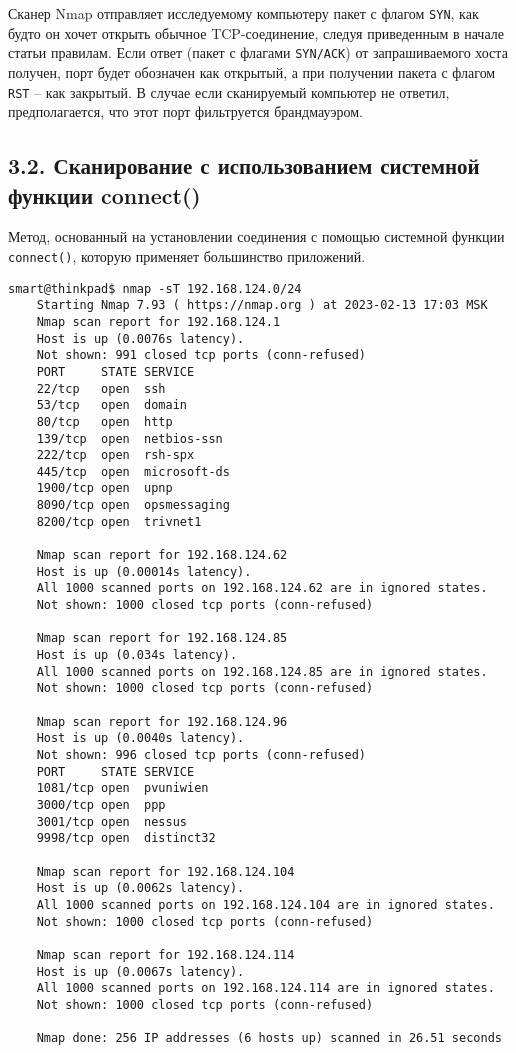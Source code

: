 Сканер Nmap отправляет исследуемому компьютеру пакет с флагом \texttt{SYN}, как будто он хочет открыть обычное TCP-соединение, следуя приведенным в начале статьи правилам. Если ответ (пакет с флагами \texttt{SYN/ACK}) от запрашиваемого хоста получен, порт будет обозначен как открытый, а при получении пакета с флагом \texttt{RST} -- как закрытый. В случае если сканируемый компьютер не ответил, предполагается, что этот порт фильтруется брандмауэром.

\subsection*{3.2. Сканирование с использованием системной функции connect()}

Метод, основанный на установлении соединения с помощью системной функции \texttt{connect()}, которую применяет большинство приложений.

\begin{Verbatim}[frame=single]
    smart@thinkpad$ nmap -sT 192.168.124.0/24
    Starting Nmap 7.93 ( https://nmap.org ) at 2023-02-13 17:03 MSK
    Nmap scan report for 192.168.124.1
    Host is up (0.0076s latency).
    Not shown: 991 closed tcp ports (conn-refused)
    PORT     STATE SERVICE
    22/tcp   open  ssh
    53/tcp   open  domain
    80/tcp   open  http
    139/tcp  open  netbios-ssn
    222/tcp  open  rsh-spx
    445/tcp  open  microsoft-ds
    1900/tcp open  upnp
    8090/tcp open  opsmessaging
    8200/tcp open  trivnet1

    Nmap scan report for 192.168.124.62
    Host is up (0.00014s latency).
    All 1000 scanned ports on 192.168.124.62 are in ignored states.
    Not shown: 1000 closed tcp ports (conn-refused)

    Nmap scan report for 192.168.124.85
    Host is up (0.034s latency).
    All 1000 scanned ports on 192.168.124.85 are in ignored states.
    Not shown: 1000 closed tcp ports (conn-refused)

    Nmap scan report for 192.168.124.96
    Host is up (0.0040s latency).
    Not shown: 996 closed tcp ports (conn-refused)
    PORT     STATE SERVICE
    1081/tcp open  pvuniwien
    3000/tcp open  ppp
    3001/tcp open  nessus
    9998/tcp open  distinct32

    Nmap scan report for 192.168.124.104
    Host is up (0.0062s latency).
    All 1000 scanned ports on 192.168.124.104 are in ignored states.
    Not shown: 1000 closed tcp ports (conn-refused)

    Nmap scan report for 192.168.124.114
    Host is up (0.0067s latency).
    All 1000 scanned ports on 192.168.124.114 are in ignored states.
    Not shown: 1000 closed tcp ports (conn-refused)

    Nmap done: 256 IP addresses (6 hosts up) scanned in 26.51 seconds
\end{Verbatim}

